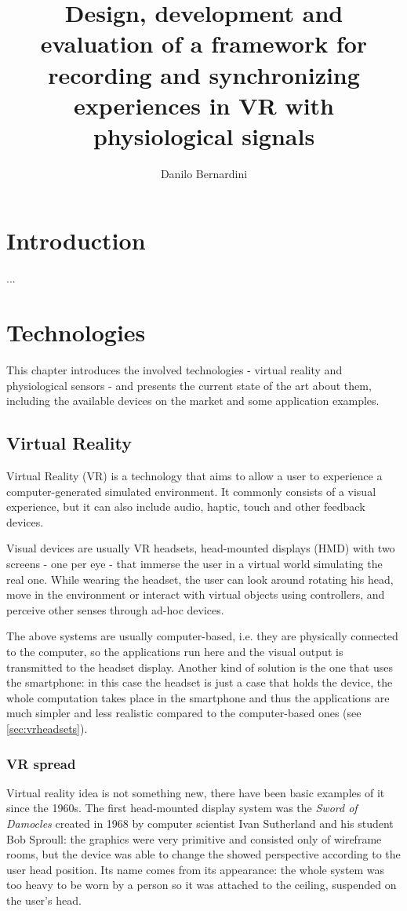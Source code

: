 \documentclass[binding=0.6cm,LaM]{sapthesis}
\title{Design, development and evaluation of a framework for recording and synchronizing experiences in VR with physiological signals}
\author{Danilo Bernardini}
\begin{document}
\frontmatter
\maketitle
\tableofcontents
\mainmatter
\chapter{Introduction}
...
\chapter{Technologies}

This chapter introduces the involved technologies - virtual reality and physiological sensors -  and presents the current state of the art about them, including the available devices on the market and some application examples.

\section{Virtual Reality}
Virtual Reality (VR) is a technology that aims to allow a user to experience a computer-generated simulated environment. It commonly consists of a visual experience, but it can also include audio, haptic, touch and other feedback devices. 

Visual devices are usually VR headsets, head-mounted displays (HMD) with two screens - one per eye - that immerse the user in a virtual world simulating the real one. While wearing the headset, the user can look around rotating his head, move in the environment or interact with virtual objects using controllers, and perceive other senses through ad-hoc devices.

The above systems are usually computer-based, i.e. they are physically connected to the computer, so the applications run here and the visual output is transmitted to the headset display.
Another kind of solution is the one that uses the smartphone: in this case the headset is just a case that holds the device, the whole computation takes place in the smartphone and thus the applications are much simpler and less realistic compared to the computer-based ones (see \ref{sec:vrheadsets}).
	
\subsection{VR spread}
Virtual reality idea is not something new, there have been basic examples of it since the 1960s. The first head-mounted display system was the \textit{Sword of Damocles} \cite{sutherland1968head} created in 1968 by computer scientist Ivan Sutherland and his student Bob Sproull: the graphics were very primitive and consisted only of wireframe rooms, but the device was able to change the showed perspective according to the user head position. Its name comes from its appearance: the whole system was too heavy to be worn by a person so it was attached to the ceiling, suspended on the user's head.
\end{document}
